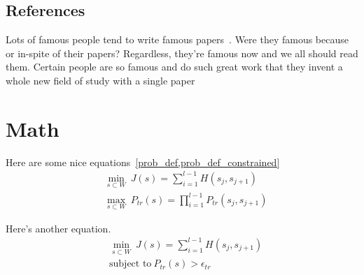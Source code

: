 \subsection{References}

Lots of famous people tend to write famous papers~\cite{newton1999}. 
Were they famous because or in-spite of their papers?
Regardless, they're famous now and we all should read them.
Certain people are so famous and do such great work that they invent a whole new field of study with a single paper~\cite{kalman1960,shannon1949}

\section{Math}

Here are some nice equations~\cref{prob_def,prob_def_constrained}
\begin{align}
\label{prob_def}
&\min_{s\subset W}\ J(s) = \sum_{i=1}^{l-1} H(s_j, s_{j+1}) \\
&\max_{s\subset W}\ P_{tr}(s) = \prod_{i=1}^{l-1} P_{tr}(s_j, s_{j+1}) \nonumber
\end{align}

Here's another equation.
\begin{align}
\label{prob_def_constrained}
&\min_{s\subset W}\ J(s) = \sum_{i=1}^{l-1} H(s_j, s_{j+1}) \\
&\text{subject to} \ P_{tr}(s)>\epsilon_{tr} \nonumber
\end{align}






